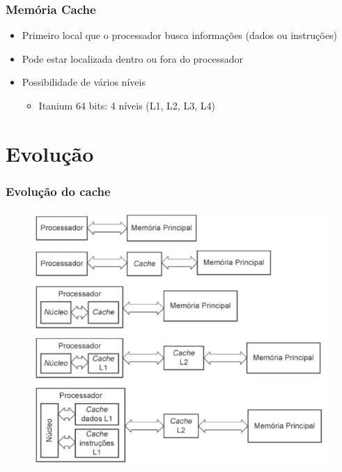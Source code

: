 \documentclass[aspectratio=169,
				xcolor=table]{beamer}
\begin{document}
	\begin{frame}
		\frametitle{Memória Cache}
		\begin{itemize}
			\item Primeiro local que o processador busca informações (dados ou instruções)
			\vspace{1em}
			\item Pode estar localizada dentro ou fora do processador
			\vspace{1em}
			\item Possibilidade de vários níveis
			\begin{itemize}
				\item Itanium 64 bits: 4 níveis (L1, L2, L3, L4)
			\end{itemize}

		\end{itemize}
	\end{frame}

	\section{Evolução}
	\begin{frame}
		\frametitle{Evolução do cache}
		
		\begin{figure}[hbtp]
			\centering
			\includegraphics[height=0.8\textheight, keepaspectratio]{../figs/cap06/evolucao1.png}
		\end{figure}
	\end{frame}
\end{document}
